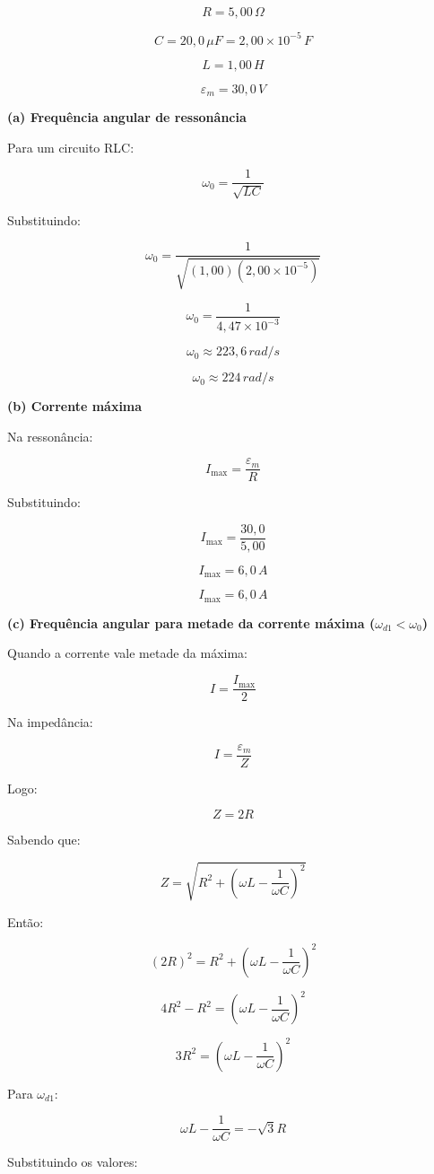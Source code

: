 \documentclass[12pt,a4paper]{article}
\begin{document}
\[
R = 5,00\,\Omega
\]

\[
C = 20,0\,\mu F = 2,00 \times 10^{-5}\,F
\]

\[
L = 1,00\,H
\]

\[
\varepsilon_m = 30,0\,V
\]

\textbf{(a) Frequência angular de ressonância}

Para um circuito RLC:

\[
\omega_0 = \frac{1}{\sqrt{LC}}
\]

Substituindo:

\[
\omega_0 = \frac{1}{\sqrt{(1,00)(2,00 \times 10^{-5})}}
\]

\[
\omega_0 = \frac{1}{4,47 \times 10^{-3}}
\]

\[
\omega_0 \approx 223,6\,rad/s
\]

\[
\boxed{\omega_0 \approx 224\,rad/s}
\]

\textbf{(b) Corrente máxima}

Na ressonância:

\[
I_{\max} = \frac{\varepsilon_m}{R}
\]

Substituindo:

\[
I_{\max} = \frac{30,0}{5,00}
\]

\[
I_{\max} = 6,0\,A
\]

\[
\boxed{I_{\max} = 6,0\,A}
\]

\textbf{(c) Frequência angular para metade da corrente máxima (\(\omega_{d1} < \omega_0\))}

Quando a corrente vale metade da máxima:

\[
I = \frac{I_{\max}}{2}
\]

Na impedância:

\[
I = \frac{\varepsilon_m}{Z}
\]

Logo:

\[
Z = 2R
\]

Sabendo que:

\[
Z = \sqrt{R^2 + \left(\omega L - \frac{1}{\omega C}\right)^2}
\]

Então:

\[
(2R)^2 = R^2 + \left(\omega L - \frac{1}{\omega C}\right)^2
\]

\[
4R^2 - R^2 = \left(\omega L - \frac{1}{\omega C}\right)^2
\]

\[
3R^2 = \left(\omega L - \frac{1}{\omega C}\right)^2
\]

Para \(\omega_{d1}\):

\[
\omega L - \frac{1}{\omega C} = -\sqrt{3}R
\]

Substituindo os valores:
\end{document}
